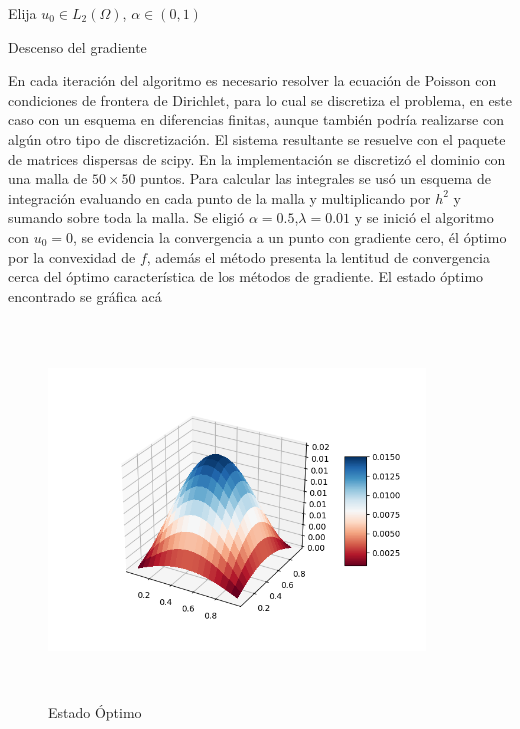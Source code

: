 \documentclass{article}
\begin{document}
\begin{algorithm}[H]
\SetAlgoLined
{}
 Elija $u_0\in L_2(\Omega)$, $\alpha\in (0,1)$ \;
 \caption{Descenso del gradiente}
\end{algorithm}
\noindent
En cada iteración del algoritmo es necesario resolver la ecuación de Poisson con condiciones de frontera de Dirichlet, para lo cual se discretiza el problema, en este caso con un esquema en diferencias finitas, aunque también podría realizarse con algún otro tipo de discretización. El sistema resultante se resuelve con el paquete de matrices dispersas de scipy. En la implementación se discretizó el dominio con una malla de $50\times 50$ puntos. Para calcular las integrales se usó un esquema de  integración evaluando en cada punto de la malla y multiplicando por $h^2$ y sumando sobre toda la malla. Se eligió $\alpha=0.5$,$\lambda=0.01$ y se inició el algoritmo con $u_0=0$, se evidencia la convergencia a un punto con gradiente cero, él óptimo por la convexidad de $f$, además el método presenta la lentitud de convergencia cerca del óptimo característica de los métodos de gradiente.
El estado óptimo encontrado se gráfica acá
\begin{figure}[H]
    \centering
    \includegraphics[width=10cm, height=10cm]{Opti.png}
    \caption{Estado Óptimo}
    \label{fig:my_label}
\end{figure}
\end{document}
